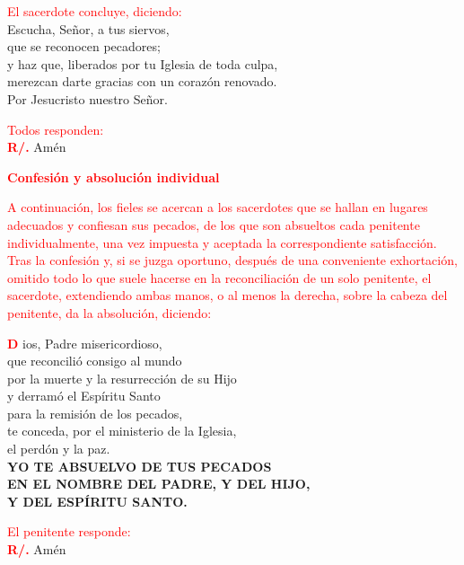 \documentclass[12pt, letterpaper]{report}
\begin{document}
\large {\textcolor{red}{El sacerdote concluye, diciendo:}}\\
\Large {Escucha, Se\~nor, a tus siervos,\\
que se reconocen pecadores;\\
y haz que, liberados por tu Iglesia de toda culpa,\\
merezcan darte gracias con un coraz\'on renovado.\\
Por Jesucristo nuestro Se\~nor.}

\large {\textcolor{red}{Todos responden:}}\\
\Large {\bfseries \textcolor{red}{R/.}} \hspace{0.5cm} \Large {Am\'en}

\newpage

\Large {\bfseries \textcolor{red}{Confesi\'on y absoluci\'on individual}}

\large {\textcolor{red}{A continuaci\'on, los fieles se acercan a los sacerdotes que se hallan en lugares adecuados y confiesan sus pecados, de los que son absueltos cada penitente individualmente, una vez impuesta y aceptada la correspondiente satisfacci\'on. Tras la confesi\'on y, si se juzga oportuno, despu\'es de una conveniente exhortaci\'on, omitido todo lo que suele hacerse en la reconciliaci\'on de un solo penitente, el sacerdote, extendiendo ambas manos, o al menos la derecha, sobre la cabeza del penitente, da la absoluci\'on, diciendo:}}

\lettrine[lines=2]{\bfseries \textcolor{red}{D}}{} \Large ios, Padre misericordioso,\\
que reconcili\'o consigo al mundo\\
por la muerte y la resurrecci\'on de su Hijo\\
y derram\'o el Esp\'iritu Santo\\
para la remisi\'on de los pecados,\\
te conceda, por el ministerio de la Iglesia,\\
el perd\'on y la paz.\\
{\bfseries YO TE ABSUELVO DE TUS PECADOS\\
EN EL NOMBRE DEL PADRE, Y DEL HIJO,\\
\Huge{\textcolor{red}{}} \Large Y DEL ESP\'IRITU SANTO.}

\large {\textcolor{red}{El penitente responde:}}\\
\noindent
\Large {\bfseries \textcolor{red}{R/.}} \hspace{0.5cm} \Large {Am\'en}
\end{document}
